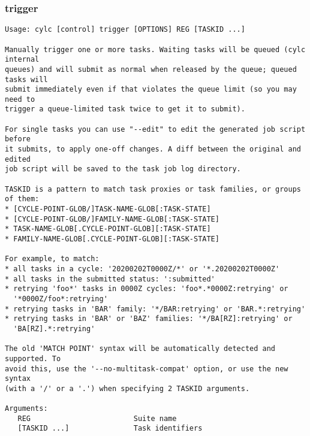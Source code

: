 \subsubsection{trigger}
\label{trigger}
\begin{lstlisting}
Usage: cylc [control] trigger [OPTIONS] REG [TASKID ...] 

Manually trigger one or more tasks. Waiting tasks will be queued (cylc internal
queues) and will submit as normal when released by the queue; queued tasks will
submit immediately even if that violates the queue limit (so you may need to
trigger a queue-limited task twice to get it to submit).

For single tasks you can use "--edit" to edit the generated job script before
it submits, to apply one-off changes. A diff between the original and edited
job script will be saved to the task job log directory.

TASKID is a pattern to match task proxies or task families, or groups of them:
* [CYCLE-POINT-GLOB/]TASK-NAME-GLOB[:TASK-STATE]
* [CYCLE-POINT-GLOB/]FAMILY-NAME-GLOB[:TASK-STATE]
* TASK-NAME-GLOB[.CYCLE-POINT-GLOB][:TASK-STATE]
* FAMILY-NAME-GLOB[.CYCLE-POINT-GLOB][:TASK-STATE]

For example, to match:
* all tasks in a cycle: '20200202T0000Z/*' or '*.20200202T0000Z'
* all tasks in the submitted status: ':submitted'
* retrying 'foo*' tasks in 0000Z cycles: 'foo*.*0000Z:retrying' or
  '*0000Z/foo*:retrying'
* retrying tasks in 'BAR' family: '*/BAR:retrying' or 'BAR.*:retrying'
* retrying tasks in 'BAR' or 'BAZ' families: '*/BA[RZ]:retrying' or
  'BA[RZ].*:retrying'

The old 'MATCH POINT' syntax will be automatically detected and supported. To
avoid this, use the '--no-multitask-compat' option, or use the new syntax
(with a '/' or a '.') when specifying 2 TASKID arguments.

Arguments:
   REG                        Suite name
   [TASKID ...]               Task identifiers


\end{lstlisting}
